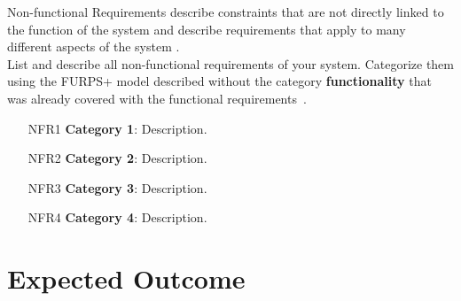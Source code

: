 \begin{tcolorbox}[breakable]
	Non-functional Requirements describe constraints that are not directly linked to the function of the system and describe requirements that apply to many different aspects of the system \cite{bruegge2013object}.
	\\
	List and describe all non-functional requirements of your system.
	Categorize them using the FURPS+ model described without the category \textbf{functionality} that was already covered with the functional requirements~\cite{bruegge2013object}. 
\end{tcolorbox}

\begin{itemize}[itemindent=-13pt, leftmargin=43pt, align=left]
    \item[NFR1] \textbf{Category 1}: Description.
    \item[NFR2] \textbf{Category 2}: Description.
    \item[NFR3] \textbf{Category 3}: Description.
    \item[NFR4] \textbf{Category 4}: Description.
\end{itemize}


\section*{Expected Outcome}

